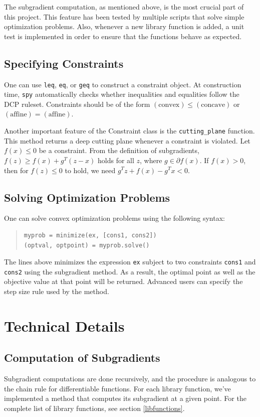 \documentclass[12pt]{article}
\begin{document}
The subgradient computation, as mentioned above, is the most crucial part of this project. This feature has been tested by multiple scripts that solve simple optimization problems. Also, whenever a new library function is added, a unit test is implemented in order to ensure that the functions behave as expected.

\subsection{Specifying Constraints}
One can use \verb'leq', \verb'eq', or \verb'geq' to construct a constraint
object. At construction time, \verb'spy' automatically checks whether inequalities
and equalities follow the DCP ruleset. Constraints should be of the form
$(\mbox{convex}) \le (\mbox{concave})$ or 
$(\mbox{affine}) = (\mbox{affine})$.

Another important feature of the Constraint class is the \verb'cutting_plane'
function. This method returns a deep cutting plane whenever a constraint is
violated. Let $f(x) \le 0$ be a constraint. From the definition of subgradients, $f(z) \ge f(x)+g^T(z-x)$ holds for all $z$, where $g \in \partial f(x)$. If $f(x)>0$, then for $f(z)\le 0$ to hold, we need $g^T z + f(x)-g^T x<0$.


\subsection{Solving Optimization Problems}
One can solve convex optimization problems using the following syntax:

\begin{quote}
\begin{verbatim}
myprob = minimize(ex, [cons1, cons2])
(optval, optpoint) = myprob.solve()
\end{verbatim}
\end{quote}

\noindent The lines above minimizes the expression \verb'ex' subject to two constraints
\verb'cons1' and \verb'cons2' using the subgradient method. As a result,
the optimal point as well as the objective value at that point will be
returned. Advanced users can specify the step size rule used by the
method.

\section{Technical Details}

\subsection{Computation of Subgradients}
Subgradient computations are done recursively, and the procedure is
analogous to the chain rule for differentiable functions. 
For each library function, we've implemented a method that computes 
its subgradient at a given point. For the complete list of library functions, see section \ref{libfunctions}.
\end{document}
